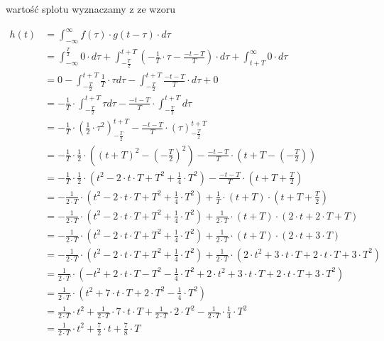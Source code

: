 \begin{task}
wartość splotu wyznaczamy z ze wzoru

\begin{align*}
h(t)&=\int_{-\infty}^{\infty} f(\tau) \cdot g(t-\tau) \cdot d\tau\\
&=\int_{-\infty}^{\frac{T}{2}} 0 \cdot d\tau + \int_{-\frac{T}{2}}^{t+T}\left( -\frac{1}{T}\cdot \tau - \frac{-t-T}{T} \right)\cdot d\tau +\int_{t+T}^{\infty} 0 \cdot d\tau\\
&=0 - \int_{-\frac{T}{2}}^{t+T} \frac{1}{T}\cdot \tau d\tau - \int_{-\frac{T}{2}}^{t+T} \frac{-t-T}{T} \cdot d\tau +0\\
&=- \frac{1}{T}\cdot \int_{-\frac{T}{2}}^{t+T} \tau d\tau - \frac{-t-T}{T} \cdot \int_{-\frac{T}{2}}^{t+T} d\tau\\
&=- \frac{1}{T}\cdot \left( \frac{1}{2} \cdot \tau^2 \right)_{-\frac{T}{2}}^{t+T} - \frac{-t-T}{T} \cdot \left(\tau \right)_{-\frac{T}{2}}^{t+T}\\
&=- \frac{1}{T}\cdot \frac{1}{2} \cdot \left(  \left(t+T\right)^2 -\left(-\frac{T}{2}\right)^2 \right) - \frac{-t-T}{T} \cdot \left(t+T - \left(-\frac{T}{2}\right) \right)\\
&=- \frac{1}{T}\cdot \frac{1}{2} \cdot \left(  t^2 -2 \cdot t \cdot T +  T^2 + \frac{1}{4}\cdot T^2 \right) - \frac{-t-T}{T} \cdot \left(t+T + \frac{T}{2} \right)\\
&=- \frac{1}{2 \cdot T} \cdot \left(  t^2 -2 \cdot t \cdot T +  T^2 + \frac{1}{4}\cdot T^2 \right) + \frac{1}{T} \cdot \left(t+T\right)\cdot \left(t+T + \frac{T}{2} \right)\\
&=- \frac{1}{2 \cdot T}\cdot \left(  t^2 -2 \cdot t \cdot T +  T^2 + \frac{1}{4}\cdot T^2 \right) + \frac{1}{2\cdot T} \cdot \left(t+T\right)\cdot \left(2 \cdot t+ 2\cdot T + T \right)\\
&=- \frac{1}{2 \cdot T}\cdot \left(  t^2 -2 \cdot t \cdot T +  T^2 + \frac{1}{4}\cdot T^2 \right) + \frac{1}{2\cdot T} \cdot \left(t+T\right)\cdot \left(2 \cdot t+ 3\cdot T \right)\\
&=- \frac{1}{2 \cdot T}\cdot \left(  t^2 -2 \cdot t \cdot T +  T^2 + \frac{1}{4}\cdot T^2 \right) + \frac{1}{2\cdot T} \cdot \left(2 \cdot t^2 + 3\cdot t \cdot T + 2 \cdot t \cdot T + 3 \cdot T^2\right)\\
&= \frac{1}{2\cdot T} \cdot \left( -t^2 +2 \cdot t \cdot T -  T^2 - \frac{1}{4}\cdot T^2  + 2 \cdot t^2 + 3\cdot t \cdot T + 2 \cdot t \cdot T + 3 \cdot T^2\right)\\
&= \frac{1}{2\cdot T} \cdot \left(t^2 + 7\cdot t \cdot T + 2 \cdot T^2  - \frac{1}{4}\cdot T^2 \right)\\
&= \frac{1}{2\cdot T} \cdot t^2 + \frac{1}{2\cdot T} \cdot 7\cdot t \cdot T + \frac{1}{2\cdot T} \cdot 2 \cdot T^2  - \frac{1}{2\cdot T} \cdot \frac{1}{4}\cdot T^2\\
&= \frac{1}{2\cdot T} \cdot t^2 + \frac{7}{2} \cdot t + \frac{7}{8} \cdot T\\
\end{align*}


\end{task}


